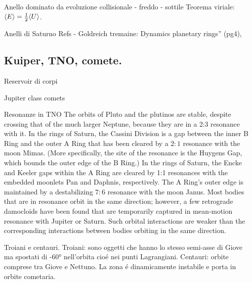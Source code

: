 \begin{wordonframe}{Anello dominato da evoluzione collisionale - freddo - sottile}
Teorema viriale: $\langle E \rangle=\frac{1}{2}\langle U \rangle$.
\end{wordonframe}

\begin{frame}{Anelli di Saturno}
Refs - Goldreich tremaine: Dynamics planetary rings'' (pg4),  
\end{frame}

\subsection{Kuiper, TNO, comete.}

\begin{frame}{Reservoir di corpi}

\end{frame}

\begin{wordonframe}{Jupiter class comets}

\end{wordonframe}

\begin{frame}{Resonanze in TNO}
The orbits of Pluto and the plutinos are stable, despite crossing that of the much larger Neptune, because they are in a 2:3 resonance with it.
In the rings of Saturn, the Cassini Division is a gap between the inner B Ring and the outer A Ring that has been cleared by a $2:1$ resonance with the moon Mimas. (More specifically, the site of the resonance is the Huygens Gap, which bounds the outer edge of the B Ring.)
    In the rings of Saturn, the Encke and Keeler gaps within the A Ring are cleared by 1:1 resonances with the embedded moonlets Pan and Daphnis, respectively. The A Ring's outer edge is maintained by a destabilizing $7:6$ resonance with the moon Janus.
Most bodies that are in resonance orbit in the same direction; however, a few retrograde damocloids have been found that are temporarily captured in mean-motion resonance with Jupiter or Saturn. Such orbital interactions are weaker than the corresponding interactions between bodies orbiting in the same direction.
\end{frame}

\begin{frame}{Troiani e centauri.}
Troiani: sono oggetti che hanno lo stesso semi-asse di Giove ma spostati di \ang{+-60} nell'orbita cio\'e nei punti Lagrangiani.
Centauri: orbite comprese tra Giove e Nettuno. La zona \'e dinamicamente instabile e porta in orbite cometaria.
\end{frame}

